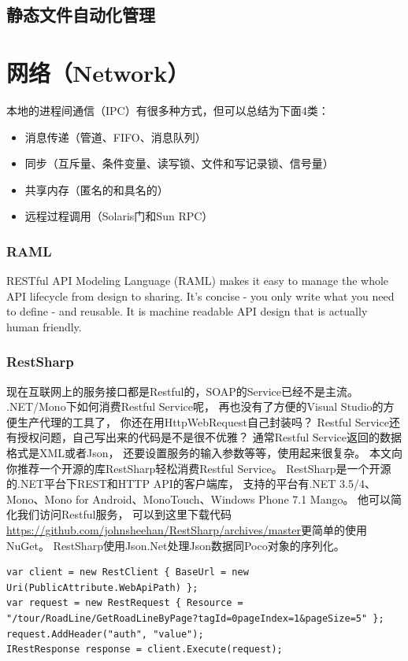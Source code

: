 \documentclass{book}
\begin{document}
\section{静态文件自动化管理}

\chapter{网络（Network）}

本地的进程间通信（IPC）有很多种方式，但可以总结为下面4类：

\begin{itemize}
	\item{消息传递（管道、FIFO、消息队列）}
	\item{同步（互斥量、条件变量、读写锁、文件和写记录锁、信号量）}
	\item{共享内存（匿名的和具名的）}
	\item{远程过程调用（Solaris门和Sun RPC）}
\end{itemize}

\subsection{RAML}

RESTful API Modeling Language (RAML) makes it easy to 
manage the whole API lifecycle from design to sharing. 
It's concise - you only write what you need to define - and reusable. 
It is machine readable API design that is actually human friendly.

\subsection{RestSharp}

现在互联网上的服务接口都是Restful的，SOAP的Service已经不是主流。
.NET/Mono下如何消费Restful Service呢，
再也没有了方便的Visual Studio的方便生产代理的工具了，
你还在用HttpWebRequest自己封装吗？
Restful Service还有授权问题，自己写出来的代码是不是很不优雅？
通常Restful Service返回的数据格式是XML或者Json，
还要设置服务的输入参数等等，使用起来很复杂。
本文向你推荐一个开源的库RestSharp轻松消费Restful Service。
RestSharp是一个开源的.NET平台下REST和HTTP API的客户端库，
支持的平台有.NET 3.5/4、Mono、Mono for Android、MonoTouch、Windows Phone 7.1 Mango。
他可以简化我们访问Restful服务，
可以到这里下载代码\url{https://github.com/johnsheehan/RestSharp/archives/master}更简单的使用NuGet。
RestSharp使用Json.Net处理Json数据同Poco对象的序列化。

\begin{lstlisting}[language={[Sharp]C}]
var client = new RestClient { BaseUrl = new Uri(PublicAttribute.WebApiPath) };
var request = new RestRequest { Resource = "/tour/RoadLine/GetRoadLineByPage?tagId=0pageIndex=1&pageSize=5" };
request.AddHeader("auth", "value");
IRestResponse response = client.Execute(request);
\end{lstlisting}
\end{document}
